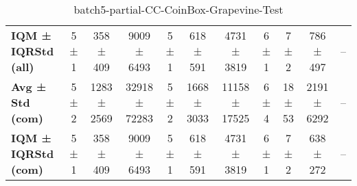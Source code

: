 \begin{table}[!ht]
\begin{tabular}{l|ccc|ccc|cccc}
\textbf{IQM ± IQRStd (all)} & 5 ± 1 & 358 ± 409 & 9009 ± 6493 & 5 ± 1 & 618 ± 591 & 4731 ± 3819 & 6 ± 1 & 7 ± 2 & 786 ± 497 & -- \\
\textbf{Avg ± Std (com)} & 5 ± 2 & 1283 ± 2569 & 32918 ± 72283 & 5 ± 2 & 1668 ± 3033 & 11158 ± 17525 & 6 ± 4 & 18 ± 53 & 2191 ± 6292 & -- \\
\textbf{IQM ± IQRStd (com)} & 5 ± 1 & 358 ± 409 & 9009 ± 6493 & 5 ± 1 & 618 ± 591 & 4731 ± 3819 & 6 ± 1 & 7 ± 2 & 638 ± 272 & -- \\
\end{tabular}
\caption{batch5-partial-CC-CoinBox-Grapevine-Test}
\label{tab:batch5_partial_CC-CoinBox-Grapevine_comparison_test}
\end{table}

